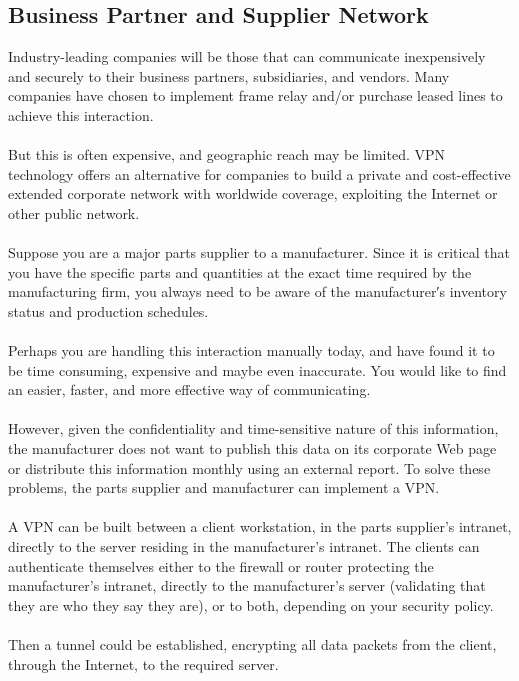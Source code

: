 \documentclass[10pt,a4paper]{article}
\begin{document}
\subsection{Business Partner and Supplier Network}
Industry-leading companies will be those that can communicate inexpensively
and securely to their business partners, subsidiaries, and vendors. Many companies have chosen to implement frame relay and/or purchase leased lines
to achieve this interaction. 
\\
\\
But this is often expensive, and geographic reach may
be limited. VPN technology offers an alternative for companies to build a private
and cost-effective extended corporate network with worldwide coverage,
exploiting the Internet or other public network.
\\
\\
Suppose you are a major parts supplier to a manufacturer. Since it is critical that
you have the specific parts and quantities at the exact time required by the
manufacturing firm, you always need to be aware of the manufacturer′s inventory
status and production schedules. 
\\
\\
Perhaps you are handling this interaction
manually today, and have found it to be time consuming, expensive and maybe
even inaccurate. You would like to find an easier, faster, and more effective way
of communicating. 
\\
\\
However, given the confidentiality and time-sensitive nature of
this information, the manufacturer does not want to publish this data on its
corporate Web page or distribute this information monthly using an external
report.
To solve these problems, the parts supplier and manufacturer can implement a
VPN. 
\\
\\
A VPN can be built between a client
workstation, in the parts supplier’s intranet, directly to the server residing in the
manufacturer’s intranet. The clients can authenticate themselves either to the
firewall or router protecting the manufacturer’s intranet, directly to the
manufacturer’s server (validating that they are who they say they are), or to both,
depending on your security policy. 
\\
\\
Then a tunnel could be established, encrypting
all data packets from the client, through the Internet, to the required server.
\end{document}
